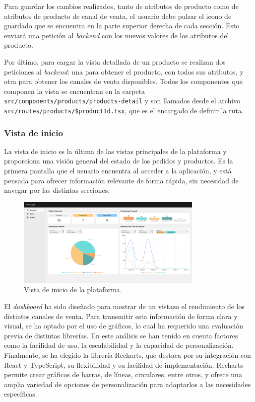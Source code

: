 Para guardar los cambios realizados, tanto de atributos de producto como de atributos de producto de canal de venta, el usuario debe pulsar el icono de guardado que se encuentra en la parte superior derecha de cada sección. Esto enviará una petición al \textit{backend} con los nuevos valores de los atributos del producto.

Por último, para cargar la vista detallada de un producto se realizan dos peticiones al \textit{backend}: una para obtener el producto, con todos sus atributos, y otra para obtener los canales de venta disponibles. Todos los componentes que componen la vista se encuentran en la carpeta \texttt{src/components/products/products-detail} y son llamados desde el archivo \texttt{src/routes/products/\$productId.tsx}, que es el encargado de definir la ruta.

\subsubsection{Vista de inicio}
\label{dev:subsubsec:vista_inicio}
La vista de inicio es la última de las vistas principales de la plataforma y proporciona una visión general del estado de los pedidos y productos. Es la primera pantalla que el usuario encuentra al acceder a la aplicación, y está pensada para ofrecer información relevante de forma rápida, sin necesidad de navegar por las distintas secciones.

\begin{figure}[H]
    \centering
    \includegraphics[width=0.8\textwidth]{figures/design_develop/screenshots/dashboard.png}
    \caption{Vista de inicio de la plataforma.}
    \label{fig:dev:ss:vista_inicio}
\end{figure}

El \textit{dashboard} ha sido diseñado para mostrar de un vistazo el rendimiento de los distintos canales de venta. Para transmitir esta información de forma clara y visual, se ha optado por el uso de gráficos, lo cual ha requerido una evaluación previa de distintas librerías. En este análisis se han tenido en cuenta factores como la facilidad de uso, la escalabilidad y la capacidad de personalización. Finalmente, se ha elegido la librería Recharts, que destaca por su integración con React y TypeScript, su flexibilidad y su facilidad de implementación. Recharts permite crear gráficos de barras, de líneas, circulares, entre otros, y ofrece una amplia variedad de opciones de personalización para adaptarlos a las necesidades específicas.


